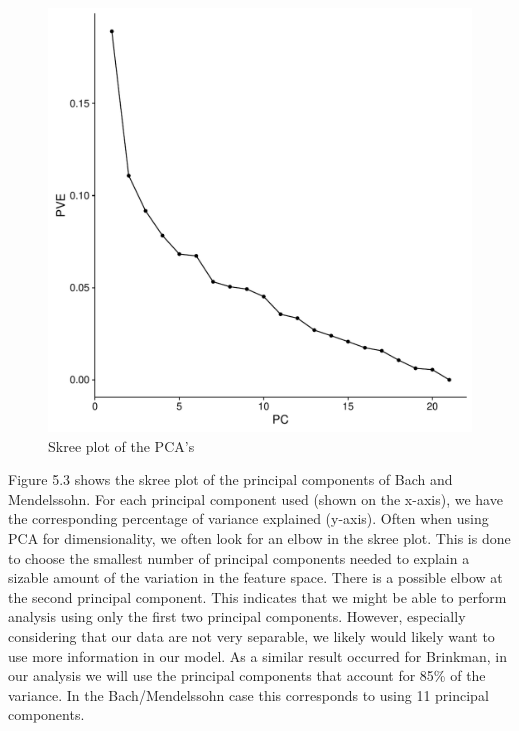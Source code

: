 \documentclass[12pt,twoside]{reedthesis}
\theoremstyle{definition}
\theoremstyle{definition}
\theoremstyle{definition}
\theoremstyle{remark}
\begin{document}
\begin{figure}[H]
\centering
\includegraphics[scale = .5]{images/skree_b.pdf}
\caption{Skree plot of the PCA's}
\label{subd}
\end{figure}
Figure 5.3 shows the skree plot of the principal components of Bach and
Mendelssohn. For each principal component used (shown on the x-axis), we
have the corresponding percentage of variance explained (y-axis). Often
when using PCA for dimensionality, we often look for an elbow in the
skree plot. This is done to choose the smallest number of principal
components needed to explain a sizable amount of the variation in the
feature space. There is a possible elbow at the second principal
component. This indicates that we might be able to perform analysis
using only the first two principal components. However, especially
considering that our data are not very separable, we likely would likely
want to use more information in our model. As a similar result occurred
for Brinkman, in our analysis we will use the principal components that
account for 85\% of the variance. In the Bach/Mendelssohn case this
corresponds to using 11 principal components.
\end{document}
